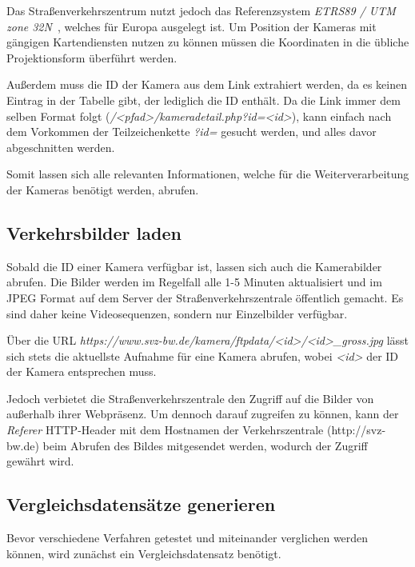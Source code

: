 Das Straßenverkehrszentrum nutzt jedoch das Referenzsystem {\em ETRS89 / UTM zone 32N}~\cite{etrs89}, welches für Europa ausgelegt ist.
Um Position der Kameras mit gängigen Kartendiensten nutzen zu können müssen die Koordinaten in die übliche Projektionsform überführt werden.

Außerdem muss die ID der Kamera aus dem Link extrahiert werden, da es keinen Eintrag in der Tabelle gibt, der lediglich die ID enthält.
Da die Link immer dem selben Format folgt ({\em /<pfad>/kameradetail.php?id=<id>}), kann einfach nach dem Vorkommen der Teilzeichenkette {\em ?id=} gesucht werden, und alles davor abgeschnitten werden.

Somit lassen sich alle relevanten Informationen, welche für die Weiterverarbeitung der Kameras benötigt werden, abrufen.

\subsection{Verkehrsbilder laden}
Sobald die ID einer Kamera verfügbar ist, lassen sich auch die Kamerabilder abrufen.
Die Bilder werden im Regelfall alle 1-5 Minuten aktualisiert und im JPEG Format auf dem Server der Straßenverkehrszentrale öffentlich gemacht.
Es sind daher keine Videosequenzen, sondern nur Einzelbilder verfügbar.

Über die URL {\em https://www.svz-bw.de/kamera/ftpdata/<id>/<id>\_gross.jpg} lässt sich stets die aktuellste Aufnahme für eine Kamera abrufen, wobei {\em <id>} der ID der Kamera entsprechen muss.

Jedoch verbietet die Straßenverkehrszentrale den Zugriff auf die Bilder von außerhalb ihrer Webpräsenz.
Um dennoch darauf zugreifen zu können, kann der {\em Referer} HTTP-Header mit dem Hostnamen der Verkehrszentrale (http://svz-bw.de) beim Abrufen des Bildes mitgesendet werden, wodurch der Zugriff gewährt wird. 

\subsection{Vergleichsdatensätze generieren}
Bevor verschiedene Verfahren getestet und miteinander verglichen werden können, wird zunächst ein Vergleichsdatensatz benötigt.



